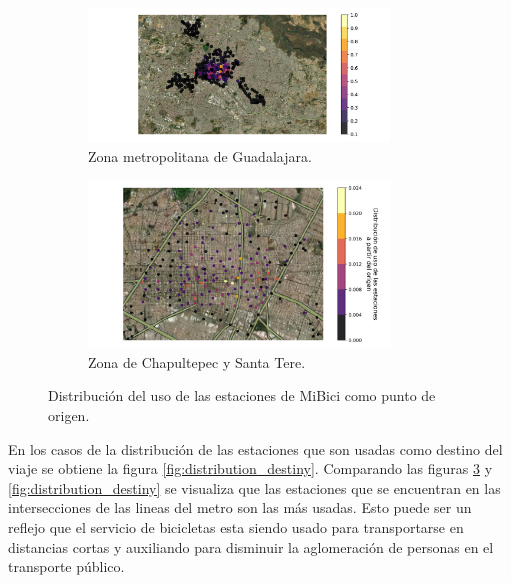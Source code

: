 \begin{figure}[H]
    \centering
    \begin{subfigure}[b]{8cm}
        \includegraphics[width=8cm]{Graphics/repetition_origen.png}
        \caption{Zona metropolitana de Guadalajara.}
        \label{fig:distribution_station_all_origin}
    \end{subfigure}
    \hspace{0.5cm}
    \begin{subfigure}[b]{8cm}
        \includegraphics[width=8cm]{Graphics/repetition_origen_zoom.png}
        \caption{Zona de Chapultepec y Santa Tere.}
        \label{fig:distribution_station_zoom_origin}
    \end{subfigure}
    \caption{Distribución del uso de las estaciones de MiBici como punto de origen.}
    \label{fig:distribution_origin}
\end{figure}

En los casos de la distribución de las estaciones que son usadas como destino del viaje se obtiene la figura \ref{fig:distribution_destiny}. Comparando las figuras \ref{fig:distribution_origin} y \ref{fig:distribution_destiny} se visualiza que las estaciones que se encuentran en las intersecciones de las lineas del metro son las más usadas. Esto puede ser un reflejo que el servicio de bicicletas esta siendo usado para transportarse en distancias cortas y auxiliando para disminuir la aglomeración de personas en el transporte público.

